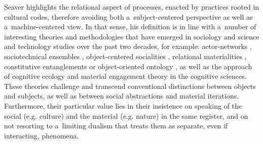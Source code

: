 Seaver highlights the relational aspect of processes, enacted by practices rooted in cultural codes, therefore avoiding both a~subject-centered perspective as well as a~machine-centered view. In that sense, his definition is in line with a~number of interesting theories and methodologies that have emerged in sociology and science and technology studies over the past two decades, for example: actor-networks
\parencites*[][]{law_elements_1986}[][]{bijker_where_1992}[][]{gallagher_how_2005}, %
 sociotechnical ensembles 
\parencite[][]{bijker_bicycles_1999}, %
 object-centered socialities 
\parencite[][]{knorr_cetina_sociality_1997}, %
 relational materialities 
\parencite[][]{law_after_2004}, %
 constitutive entanglements 
\parencite[][]{orlikowski_sociomaterial_2007} %
 or object-oriented ontology 
\parencites[][]{harman_tool-being_2002}[][]{bryant_onticologymanifesto_2010}, %
 as well as the approach of cognitive ecology 
\parencite[][]{hutchins_cognitive_2010} %
 and material engagement theory 
\parencites*[][]{malafouris_cognitive_2005}[][]{} %
 in the cognitive sciences. These theories challenge and transcend conventional distinctions between objects and subjects, as well as between social abstractions and material iterations. Furthermore, their particular value lies in their insistence on speaking of the social (e.g. culture) and the material (e.g. nature) in the same register, and on not resorting to a~limiting dualism that treats them as separate, even if interacting, phenomena.

